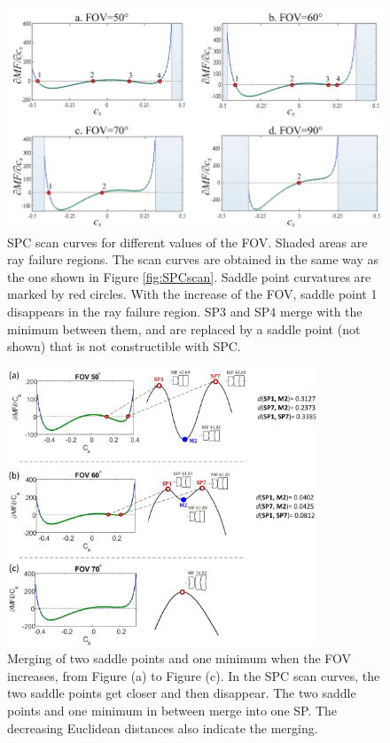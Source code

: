 \newpage
\vspace*{-10mm}
\begin{figure}[h!]
    \centering
    \setlength{\belowcaptionskip}{-10pt}
    \setlength{\abovecaptionskip}{2pt}
    \includegraphics[width=.8\textwidth]{chapter-3/figures/PhaseTransition_field.png}
    \caption{SPC scan curves for different values of the FOV. Shaded areas are ray failure regions. The scan curves are obtained in the same way as the one shown in Figure \ref{fig:SPCscan}. Saddle point curvatures are marked by red circles. With the increase of the FOV, saddle point 1 disappears in the ray failure region. SP3 and SP4 merge with the minimum between them, and are replaced by a saddle point (not shown) that is not constructible with SPC.}
    \label{fig:phasechange_field}
\end{figure}
\begin{figure}[h!]
    \centering
    \setlength{\belowcaptionskip}{-10pt}
    \setlength{\abovecaptionskip}{2pt}
    \includegraphics[width=0.822\textwidth]{chapter-3/figures/SystemDie.png}
    \caption{Merging of two saddle points and one minimum when the FOV increases, from Figure (a) to Figure (c). In the SPC scan curves, the two saddle points get closer and then disappear. The two saddle points and one minimum in between merge into one SP. The decreasing Euclidean distances also indicate the merging.}
    \label{fig:systemdie}
\end{figure}

